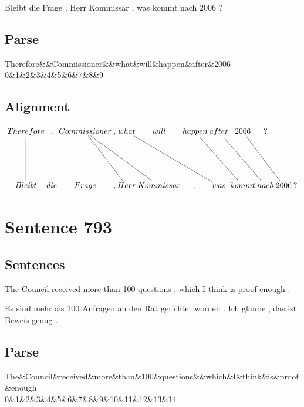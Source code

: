 \documentclass{report}
\begin{document}
\noindent Bleibt die Frage , Herr Kommissar , was kommt nach 2006 ?



\subsection*{Parse}
\begin{dependency}[theme=simple]
\begin{deptext}[column sep=.5cm, row sep=.1ex]
Therefore\&\&Commissioner\&\&what\&will\&happen\&after\&2006\\
0\&1\&2\&3\&4\&5\&6\&7\&8\&9\\
\end{deptext}
\end{dependency}


\subsection*{Alignment}
\scriptsize{
$
\xymatrix@C-2.3pc{
Therefore \ar @{-} [dd] & , & Commissioner \ar @{-} [ddrrr] \ar @{-} [ddrr] & , & what \ar @{-} [ddrrr] & will & happen \ar @{-} [ddrr] & after \ar @{-} [ddrr] & 2006 \ar @{-} [ddrr] & ?\\\\
Bleibt & die & Frage & , & Herr & Kommissar & , & was & kommt & nach & 2006 & ?
}$}
\newpage\section*{Sentence 793}

\subsection*{Sentences}
The Council received more than 100 questions , which I think is proof enough .

\noindent Es sind mehr als 100 Anfragen an den Rat gerichtet worden . Ich glaube , das ist Beweis genug .



\subsection*{Parse}
\begin{dependency}[theme=simple]
\begin{deptext}[column sep=.5cm, row sep=.1ex]
The\&Council\&received\&more\&than\&100\&questions\&\&which\&I\&think\&is\&proof\&enough\\
0\&1\&2\&3\&4\&5\&6\&7\&8\&9\&10\&11\&12\&13\&14\\
\end{deptext}
\end{dependency}
\end{document}
